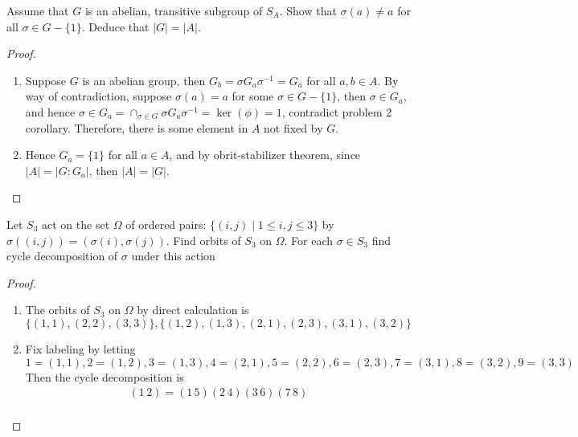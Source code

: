 \documentclass{article}
\newenvironment{problem}[2][Problem]{\begin{trivlist}
\item[\hskip \labelsep {\bfseries #1}\hskip \labelsep {\bfseries #2.}]}{\end{trivlist}}
\begin{document}
\begin{problem}{3}
    Assume that $G$ is an abelian, transitive subgroup of $S_A$. Show that $\sigma(a)\neq a $ for all $\sigma \in G-\{1\}$. Deduce that $|G|=|A|$.
\end{problem}
\begin{proof}
    \begin{enumerate}
        \item Suppose $G$ is an abelian group, then $G_b = \sigma G_a \sigma^{-1} = G_a$ for all $a, b \in A$. By way of contradiction, suppose $\sigma(a)=a$ for some $\sigma \in G - \{1\}$, then $\sigma \in G_a$, and hence $\sigma \in G_a = \cap_{\sigma\in G}\sigma G_a \sigma^{-1} = \ker(\phi)=1$, contradict problem 2 corollary. Therefore, there is some element in $A$ not fixed by $G$. 
        \item Hence $G_a =\{1\}$ for all $a \in A$, and by obrit-stabilizer theorem, since $|A| = |G:G_a|$, then $|A|=|G|$.
    \end{enumerate}
\end{proof}
\begin{problem}{4}
    Let $S_3$ act on the set $\Omega$ of ordered pairs: $\{(i, j)\mid 1 \leq i, j\leq 3\}$ by $\sigma((i, j))=(\sigma(i), \sigma(j))$. Find orbits of $S_3$ on $\Omega$. For each $\sigma \in S_3$ find cycle decomposition of $\sigma$ under this action
\end{problem}
\begin{proof}
    \begin{enumerate}
        \item The orbits of $S_3$ on $\Omega$ by direct calculation is 
        \[\{(1, 1), (2, 2), (3, 3)\}, \{(1, 2), (1, 3), (2, 1), (2, 3), (3, 1), (3, 2)\}\]
        \item Fix labeling by letting 
        \[
        1 = (1, 1), 2 = (1, 2), 3=(1, 3), 4=(2, 1), 5=(2, 2), 6=(2, 3), 7=(3, 1), 8=(3, 2), 9=(3, 3)
        \]
        Then the cycle decomposition is
        \begin{align*}
            (1\hspace{2pt}2) = (1\hspace{2pt} 5)(2\hspace{2pt} 4)(3\hspace{2pt} 6)(7 \hspace{2pt}8)\\
        \end{align*}
    \end{enumerate}
\end{proof}
\end{document}
